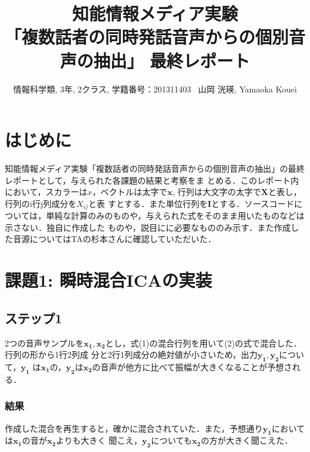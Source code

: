 \documentclass[a4j]{jarticle}
\title{知能情報メディア実験\\ 「複数話者の同時発話音声からの個別音声の抽出」
最終レポート}
\author{情報科学類, 3年, 2クラス, 学籍番号：201311403 \ 山岡 洸瑛, Yamaoka
Kouei}
\date{}
\begin{document}
\maketitle
\section*{はじめに}
知能情報メディア実験「複数話者の同時発話音声からの個別音声の抽出」の最終レポートとして，与えられた各課題の結果と考察をま
とめる．このレポート内において，スカラーは$x$，ベクトルは太字で$\bm{x}$, 行列は大文字の太字で$\bm{X}$と表し，行列のi行j列成分を$X_{ij}$と表
すとする．また単位行列を$\bm{I}$とする．ソースコードについては，単純な計算のみのものや，与えられた式をそのまま用いたものなどは示さない．独自に作成した
ものや，説目にに必要なもののみ示す．また作成した音源についてはTAの杉本さんに確認していただいた．
\section*{課題1: 瞬時混合ICAの実装}
\subsection*{ステップ1}
2つの音声サンプルを$\bm{x_1}, \bm{x_2}$とし，式(1)の混合行列を用いて(2)の式で混合した．行列の形から1行2列成
分と2行1列成分の絶対値が小さいため，出力$\bm{y_1}, \bm{y_2}$について，$\bm{y_1}$
は$\bm{x_1}$の，$\bm{y_2}$は$\bm{x_2}$の音声が他方に比べて振幅が大きくなることが予想される．
\subsubsection*{結果}
作成した混合を再生すると，確かに混合されていた．また，予想通り$\bm{y_1}$においては$\bm{x_1}$の音が$\bm{x_2}$よりも大きく
聞こえ，$\bm{y_2}$についても$\bm{x_2}$の方が大きく聞こえた．
\end{document}
